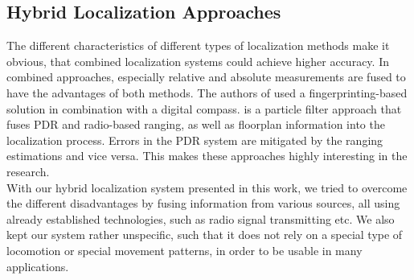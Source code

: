 \subsection{Hybrid Localization Approaches}
The different characteristics of different types of localization methods make it obvious, that combined localization systems could achieve higher accuracy. In combined approaches, especially relative and absolute measurements are fused to have the advantages of both methods. The authors of \cite{Nagpal} used a fingerprinting-based solution in combination with a digital compass. \cite{Carrera} is a particle filter approach that fuses PDR and radio-based ranging, as well as floorplan information into the localization process. Errors in the PDR system are mitigated by the ranging estimations and vice versa. This makes these approaches highly interesting in the research.\\
\noindent\hspace*{5mm}%
With our hybrid localization system presented in this work, we tried to overcome the different disadvantages by fusing information from various sources, all using already established technologies, such as radio signal transmitting etc. We also kept our system rather unspecific, such that it does not rely on a special type of locomotion or special movement patterns, in order to be usable in many applications.




